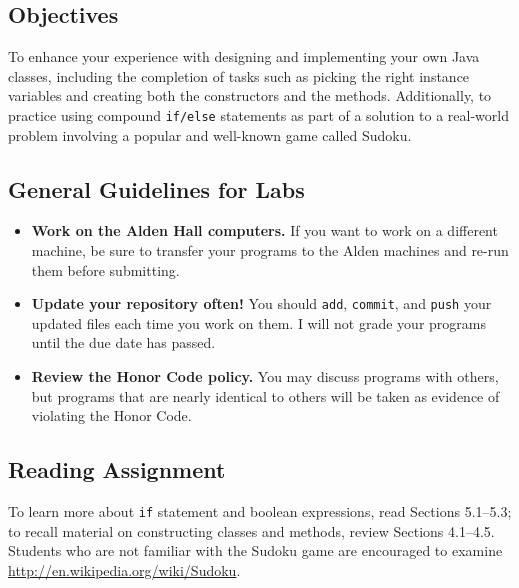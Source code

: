



\vspace{-0.2in}
\subsection*{Objectives}
\vspace{-0.05in}

To enhance your experience with designing and implementing your own Java classes, including the completion of tasks such
as picking the right instance variables and creating both the constructors and the methods.  Additionally, to practice
using compound {\tt if/else} statements as part of a solution to a real-world problem involving a popular and well-known
game called Sudoku.

\vspace{-0.15in}
\subsection*{General Guidelines for Labs}
\vspace{-0.05in}
\begin{itemize}
\item
{\bf Work on the Alden Hall computers.} If you want to work on a different
machine, be sure to transfer your programs to the Alden
machines and re-run them before submitting.
\item
  {\bf Update your repository often!} You should {\tt add}, {\tt commit},
  and {\tt push} your updated files each time you work on them.  I will not grade
your programs until the due date has passed.
\item
{\bf Review the Honor Code policy.} You
may discuss programs with others, but programs that are nearly identical
to others will be taken as evidence of violating the Honor Code.
\end{itemize}

\vspace{-0.15in}
\subsection*{Reading Assignment}
\vspace{-0.05in}

To learn more about {\tt if} statement and boolean expressions, read Sections 5.1--5.3; to recall material on
constructing classes and methods, review Sections 4.1--4.5.  Students who are not familiar with the Sudoku game are
encouraged to examine \url{http://en.wikipedia.org/wiki/Sudoku}.

